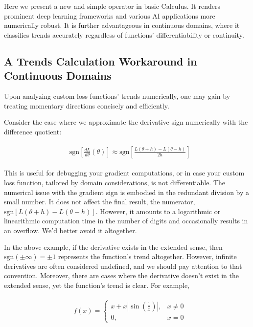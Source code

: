 \documentclass[11pt]{book}
\begin{document}
Here we present a new and simple operator in basic Calculus. It renders prominent deep learning frameworks and various AI applications more numerically robust. It is further advantageous in continuous domains, where it classifies trends accurately regardless of functions’ differentiability or continuity.

\subsection{A Trends Calculation Workaround in Continuous Domains}
Upon analyzing custom loss functions' trends numerically, one may gain by treating momentary directions concisely and efficiently.

Consider the case where we approximate the derivative sign numerically with the difference quotient:

\begin{align}
&\begin{aligned}
\text{sgn}\left[\frac{dL}{d\theta}\left(\theta\right)\right]\approx \text{sgn}\left[\frac{L\left(\theta+h\right)-L\left(\theta-h\right)}{2h}\right]
\end{aligned}
\end{align}


This is useful for debugging your gradient computations, or in case your custom loss function, tailored by domain considerations, is not differentiable. The numerical issue with the gradient sign is embodied in the redundant division by a small number. It does not affect the final result, the numerator, $\text{sgn}\left[L\left(\theta+h\right)-L\left(\theta-h\right)\right]$. However, it amounts to a logarithmic or linearithmic computation time in the number of digits and occasionally results in an overflow. We’d better avoid it altogether.

In the above example, if the derivative exists in the extended sense, then $\text{sgn}\left(\pm \infty\right) = \pm 1$ represents the function’s trend altogether. However, infinite derivatives are often considered undefined, and we should pay attention to that convention. Moreover, there are cases where the derivative doesn’t exist in the extended sense, yet the function’s trend is clear. For example,

\begin{align}
&\begin{aligned} f\left(x\right)=\begin{cases}
x+x\left|\sin\left(\frac{1}{x}\right)\right|,  &x\neq0\\
0, &x=0
\end{cases}
\end{aligned}
\end{align}
\end{document}
